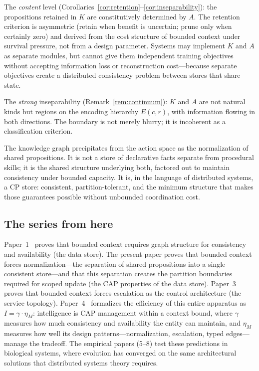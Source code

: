 \documentclass[11pt]{article}
\theoremstyle{definition}
\theoremstyle{remark}
\begin{document}
The \emph{content} level (Corollaries~\ref{cor:retention}--\ref{cor:inseparability}):
the propositions retained in $K$ are constitutively determined by
$A$. The retention criterion is asymmetric (retain when benefit is
uncertain; prune only when certainly zero) and derived from the cost
structure of bounded context under survival pressure, not from a
design parameter. Systems may implement $K$ and $A$ as separate
modules, but cannot give them independent training objectives without
accepting information loss or reconstruction cost---because separate
objectives create a distributed consistency problem between stores
that share state.

The \emph{strong} inseparability (Remark~\ref{rem:continuum}): $K$
and $A$ are not natural kinds but regions on the encoding hierarchy
$E(c,r)$, with information flowing in both directions. The boundary
is not merely blurry; it is incoherent as a classification criterion.

The knowledge graph precipitates from the action space as the
normalization of shared propositions. It is not a store of declarative
facts separate from procedural skills; it is the shared structure
underlying both, factored out to maintain consistency under bounded
capacity. It is, in the language of distributed systems, a CP store:
consistent, partition-tolerant, and the minimum structure that makes
those guarantees possible without unbounded coordination cost.

\subsection*{The series from here}

Paper~1~\cite{McCarthy2026a} proves that bounded context requires
graph structure for consistency and availability (the data store).
The present paper proves that bounded context forces
normalization---the separation of shared propositions into a single
consistent store---and that this separation creates the partition
boundaries required for scoped update (the CAP properties of the
data store). Paper~3~\cite{McCarthy2026c}
proves that bounded context forces escalation as the control
architecture (the service topology). Paper~4~\cite{McCarthy2026d}
formalizes the efficiency of this entire apparatus as $I = \gamma
\cdot \eta_M$: intelligence is CAP management within a context bound,
where $\gamma$ measures how much consistency and availability the
entity can maintain, and $\eta_M$ measures how well its design
patterns---normalization, escalation, typed edges---manage the
tradeoff. The empirical papers (5--8) test these predictions in
biological systems, where evolution has converged on the same
architectural solutions that distributed systems theory requires.
\end{document}
